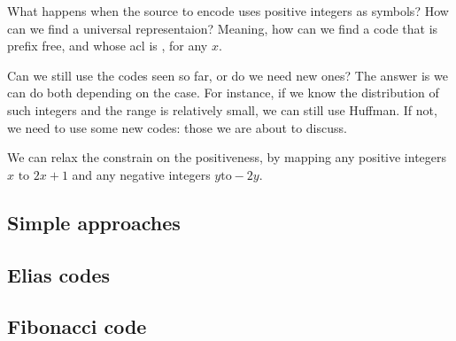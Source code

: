 \documentclass{subfiles}
\begin{document}
\label{Sec:4}
    What happens when the source to encode uses positive integers as symbols?
        How can we find a universal representaion? 
        Meaning, how can we find a code that is prefix free,
        and whose \gls{acl} is , for any \(x\).

    Can we still use the codes seen so far, or do we need new ones?
        The answer is we can do both depending on the case.
        For instance, if we know the distribution of such integers and the range is
        relatively small, we can still use Huffman. 
        If not, we need to use some new codes: those we are about to discuss.

    \begin{remark*}
        We can relax the constrain on the positiveness, 
            by mapping any positive integers \(x \text{ to } 2x + 1\) and 
            any negative integers \(y \text{to} -2y\).
    \end{remark*}

    \subsection{Simple approaches}
    

    \subsection{Elias codes}
    

    \subsection{Fibonacci code}
    
\end{document}
